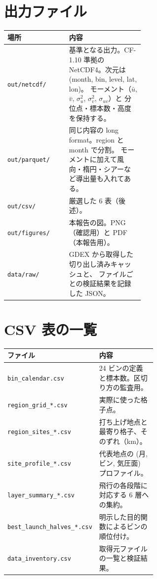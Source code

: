 \clearpage
\appendix

\renewcommand{\thesection}{付録\Alph{section}}
\renewcommand{\thesubsection}{\Alph{section}.\arabic{subsection}}

\section{出力ファイル}

\begin{longtable}{lp{0.55\linewidth}}
\toprule
場所 & 内容 \\
\midrule
\endhead
\texttt{out/netcdf/} & 基準となる出力。CF-1.10 準拠の NetCDF4。次元は (month, bin, level, lat, lon)。
  モーメント（$\bar u$, $\bar v$, $\sigma_u^2$, $\sigma_v^2$, $\sigma_{uv}$）と
  分位点・標本数・高度を保持する。 \\
\texttt{out/parquet/} & 同じ内容の long format。region と month で分割。
  モーメントに加えて風向・楕円・シアーなど導出量も入れてある。 \\
\texttt{out/csv/} & 厳選した 6 表（後述）。 \\
\texttt{out/figures/} & 本報告の図。PNG（確認用）と PDF（本報告用）。 \\
\texttt{data/raw/} & GDEX から取得した切り出し済みキャッシュと、
  ファイルごとの検証結果を記録した JSON。 \\
\bottomrule
\end{longtable}

\section{CSV 表の一覧}

\begin{longtable}{lp{0.6\linewidth}}
\toprule
ファイル & 内容 \\
\midrule
\endhead
\texttt{bin\_calendar.csv} & 24 ビンの定義と標本数。区切り方の監査用。 \\
\texttt{region\_grid\_*.csv} & 実際に使った格子点。 \\
\texttt{region\_sites\_*.csv} & 打ち上げ地点と最寄り格子、そのずれ（km）。 \\
\texttt{site\_profile\_*.csv} & 代表地点の (月, ビン, 気圧面) プロファイル。 \\
\texttt{layer\_summary\_*.csv} & 飛行の各段階に対応する 6 層への集約。 \\
\texttt{best\_launch\_halves\_*.csv} & 明示した目的関数によるビンの順位付け。 \\
\texttt{data\_inventory.csv} & 取得元ファイルの一覧と検証結果。 \\
\bottomrule
\end{longtable}

